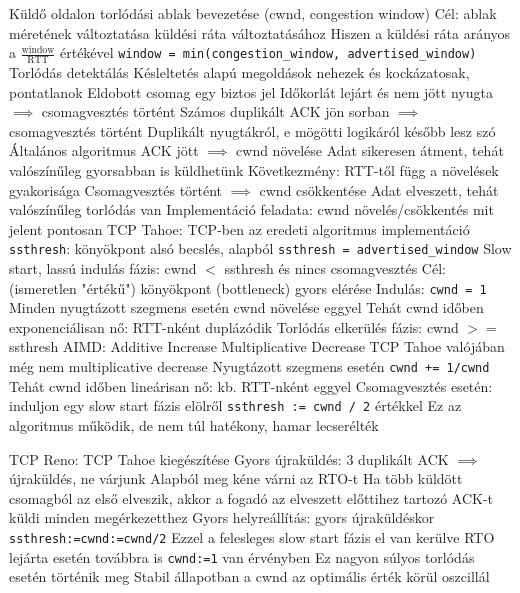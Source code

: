 \documentclass[12pt,a4paper]{article}
\begin{document}
\begin{outline}
	\1 Küldő oldalon torlódási ablak bevezetése (cwnd, congestion window)
		\2 Cél: ablak méretének változtatása küldési ráta változtatásához
		\2 Hiszen a küldési ráta arányos a $\frac{\text{window}}{\text{RTT}}$ értékével
		\2 \texttt{window = min(congestion\_window, advertised\_window)}
	\1 Torlódás detektálás
		\2 Késleltetés alapú megoldások nehezek és kockázatosak, pontatlanok
		\2 Eldobott csomag egy biztos jel
			\3 Időkorlát lejárt és nem jött nyugta $\implies$ csomagvesztés történt
			\3 Számos duplikált ACK jön sorban $\implies$ csomagvesztés történt
				\4 Duplikált nyugtákról, e mögötti logikáról később lesz szó
	\1 Általános algoritmus
		\2 ACK jött $\implies$ cwnd növelése
			\3 Adat sikeresen átment, tehát valószínűleg gyorsabban is küldhetünk
			\3 Következmény: RTT-től függ a növelések gyakorisága
		\2 Csomagvesztés történt $\implies$ cwnd csökkentése
			\3 Adat elveszett, tehát valószínűleg torlódás van
		\2 Implementáció feladata: cwnd növelés/csökkentés mit jelent pontosan
	\1 TCP Tahoe: TCP-ben az eredeti algoritmus implementáció
		\2 \texttt{ssthresh}: könyökpont alsó becslés, alapból \texttt{ssthresh = advertised\_window}
		\2 Slow start, lassú indulás fázis: cwnd $<$ ssthresh és nincs csomagvesztés
			\3 Cél: (ismeretlen "értékű") könyökpont (bottleneck) gyors elérése
			\3 Indulás: \texttt{cwnd = 1}
			\3 Minden nyugtázott szegmens esetén cwnd növelése eggyel
				\4 Tehát cwnd időben exponenciálisan nő: RTT-nként duplázódik
		\2 Torlódás elkerülés fázis: cwnd $>=$ ssthresh
			\3 AIMD: Additive Increase Multiplicative Decrease
				\4 TCP Tahoe valójában még nem multiplicative decrease
			\3 Nyugtázott szegmens esetén \texttt{cwnd += 1/cwnd}
				\4 Tehát cwnd időben lineárisan nő: kb. RTT-nként eggyel
			\3 Csomagvesztés esetén: induljon egy slow start fázis elölről \texttt{ssthresh := cwnd / 2} értékkel
		\2 Ez az algoritmus működik, de nem túl hatékony, hamar lecserélték
\end{outline}

\pagebreak

\begin{outline}
	\1 TCP Reno: TCP Tahoe kiegészítése
		\2 Gyors újraküldés: 3 duplikált ACK $\implies$ újraküldés, ne várjunk
			\3 Alapból meg kéne várni az RTO-t
			\3 Ha több küldött csomagból az első elveszik, akkor a fogadó az elveszett előttihez tartozó ACK-t küldi minden megérkezetthez
		\2 Gyors helyreállítás: gyors újraküldéskor \texttt{ssthresh:=cwnd:=cwnd/2}
			\3 Ezzel a felesleges slow start fázis el van kerülve
			\3 RTO lejárta esetén továbbra is \texttt{cwnd:=1} van érvényben
				\4 Ez nagyon súlyos torlódás esetén történik meg
		\2 Stabil állapotban a cwnd az optimális érték körül oszcillál
\end{outline}
\end{document}
